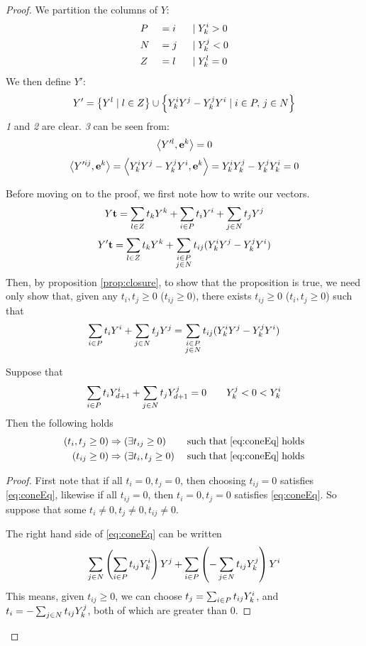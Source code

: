 \begin{proof}
We partition the columns of $ Y$:
  \begin{alignat*}{3}
  &P &&= i \;&\;|\; &Y^i_{k} > 0 \\
  &N &&= j \;&\;|\; &Y^j_{k} < 0 \\
  &Z &&= l \;&\;|\; &Y^l_{k} = 0
  \end{alignat*}
We then define $ Y'$:
\[  Y' = \left\{ Y^l \;|\; l \in Z\right\} \cup 
          \left\{Y^i_{k} Y^j - Y^j_{k} Y^i \;|\; i \in P,\, j\in N\right\} \]
\textit{1} and \textit{2} are clear.  \textit{3} can be seen from:
  \[ \left\langle Y'^l, \mathbf{e}^k \right\rangle = 0 \]
  \begin{equation}\label{eq:vdropZrows}
  \left\langle Y'^{ij}, \mathbf{e}^k \right\rangle = \left\langle Y^i_{k} Y^j - Y^j_{k} Y^i, \mathbf{e}^k \right\rangle = Y^i_{k} Y^j_{k} - Y^j_{k} Y^i_{k} = 0
  \end{equation}

Before moving on to the proof, we first note how to write our vectors.
\[  Y\mathbf{t} = \sum_{l\in Z} t_k  Y^k + \sum_{i\in P} t_i  Y^i + \sum_{j\in N} t_j  Y^j \]
\[  Y'\mathbf{t} = \sum_{l\in Z} t_k  Y^k + \sum_{\substack{i\in P \\ j\in N}} t_{ij} (Y^i_{k} Y^j - Y^j_{k} Y^i) \]
Then, by proposition \ref{prop:closure}, to show that the proposition is true, we need only show that, given any $t_i, t_j \geq 0$ ($t_{ij} \geq 0)$, there exists $t_{ij} \geq 0$ ($t_i, t_j \geq 0$) such that
\begin{equation} \label{eq:coneEq}
  \sum_{i\in P} t_i  Y^i + \sum_{j\in N} t_j  Y^j = \sum_{\substack{i\in P \\ j\in N}} t_{ij} (Y^i_{k} Y^j - Y^j_{k} Y^i)
\end{equation}
\begin{Prop}{
  Suppose that 
  \[ \sum_{i\in P} t_i  Y^i_{d+1} + \sum_{j\in N} t_j  Y^j_{d+1} = 0\quad\quad Y^j_{k} < 0 < Y^i_{k} \]
  Then the following holds
\begin{alignat*}{2} 
(t_i, t_j \geq 0)& \Rightarrow (\exists t_{ij} \geq 0)
                       && \mathrm{\;such\; that\; \eqref{eq:coneEq}\; holds}  \\
(t_{ij} \geq 0)& \Rightarrow (\exists t_i, t_j \geq 0)
                       && \mathrm{\;such\; that\; \eqref{eq:coneEq}\; holds}
\end{alignat*}
}\end{Prop}
\begin{proof}
First note that if all $t_i = 0,t_j = 0$, then choosing $t_{ij} = 0$ satisfies \eqref{eq:coneEq}, likewise if all $t_{ij} = 0$, then $t_i = 0, t_j = 0$ satisfies \eqref{eq:coneEq}.  So suppose that some $t_i \neq 0, t_j \neq 0, t_{ij} \neq 0$.

The right hand side of \eqref{eq:coneEq} can be written
\[ \sum_{j\in N} \left(\sum_{i\in P} t_{ij}Y^i_{k}\right) Y^j + 
   \sum_{i\in P} \left(-\sum_{j\in N} t_{ij}Y^j_{k}\right) Y^i \]
This means, given $t_{ij} \geq 0$, we can choose $t_j = \sum_{i\in P} t_{ij}Y^i_{k}$, and $t_i = -\sum_{j\in N} t_{ij}Y^j_{k}$, both of which are greater than $0$.


\end{proof}
\end{proof}
